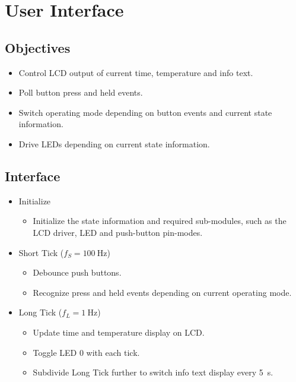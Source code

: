 \chapter{User Interface}

\section{Objectives}

\begin{itemize}
    \item Control LCD output of current time, temperature and info text.
    \item Poll button press and held events.
    \item Switch operating mode depending on button events and current state information.
    \item Drive LEDs depending on current state information.
\end{itemize}

\section{Interface}

\begin{itemize}
    \item Initialize
          \begin{itemize}
              \item Initialize the state information and required sub-modules, such as the LCD driver, LED and push-button pin-modes.
          \end{itemize}
    \item Short Tick (\(f_{S}=\SI{100}{\hertz}\))
          \begin{itemize}
              \item Debounce push buttons.
              \item Recognize press and held events depending on current operating mode.
          \end{itemize}
    \item Long Tick (\(f_{L}=\SI{1}{\hertz}\))
          \begin{itemize}
              \item Update time and temperature display on LCD.
              \item Toggle LED 0 with each tick.
              \item Subdivide Long Tick further to switch info text display every \SI{5}{\second}.
          \end{itemize}
\end{itemize}

